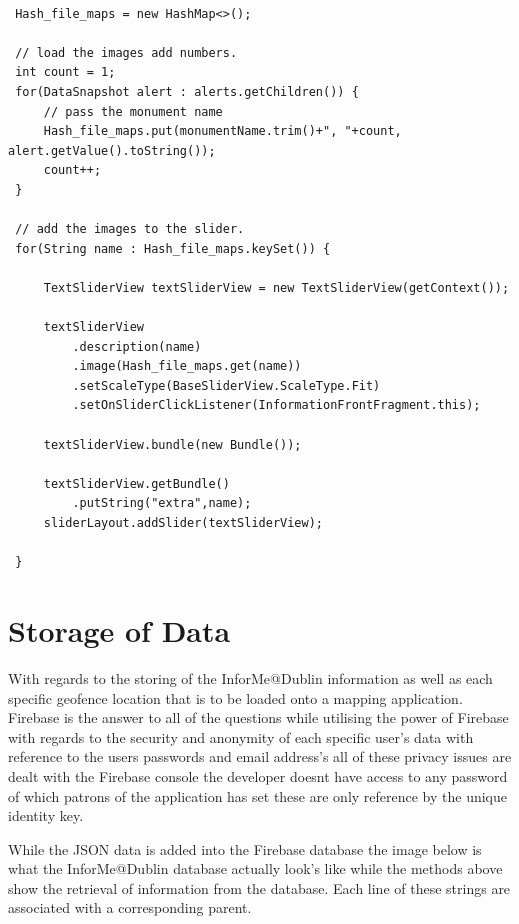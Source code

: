 \begin{lstlisting}[style=myCustomMatlabStyle, basicstyle=\small, breaklines, caption=Loading Images on InformationFrontActivity,captionpos=b]

 Hash_file_maps = new HashMap<>();
 
 // load the images add numbers.
 int count = 1;
 for(DataSnapshot alert : alerts.getChildren()) {
     // pass the monument name
     Hash_file_maps.put(monumentName.trim()+", "+count, alert.getValue().toString());
     count++;
 }
 
 // add the images to the slider.
 for(String name : Hash_file_maps.keySet()) {
     
     TextSliderView textSliderView = new TextSliderView(getContext());
     
     textSliderView
         .description(name)
         .image(Hash_file_maps.get(name))
         .setScaleType(BaseSliderView.ScaleType.Fit)
         .setOnSliderClickListener(InformationFrontFragment.this);
         
     textSliderView.bundle(new Bundle());
     
     textSliderView.getBundle()
         .putString("extra",name);
     sliderLayout.addSlider(textSliderView);
     
 }
\end{lstlisting}

\section{Storage of Data}
With regards to the storing of the InforMe@Dublin information as well as each specific geofence location that is to be loaded onto a mapping application. Firebase is the answer to all of the questions while utilising the power of Firebase with regards to the security and anonymity of each specific user's data with reference to the users passwords and email address's all of these privacy issues are dealt with the Firebase console the developer doesnt have access to any password of which patrons of the application has set these are only reference by the unique identity key.

While the JSON data is added into the Firebase database the image below is what the InforMe@Dublin database actually look's like while the methods above show the retrieval of information from the database. Each line of these strings are associated with a corresponding parent.

